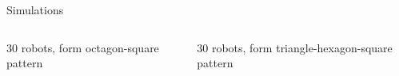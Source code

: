 \documentclass[10pt]{beamer}
\begin{document}
\begin{frame}{Simulations}
  \begin{columns}
    \begin{column}{.45\textwidth}
      30 robots, form octagon-square pattern
       \begin{center}
       \end{center}
    \end{column}
    \begin{column}{.45\textwidth}
      30 robots, form triangle-hexagon-square pattern
       \begin{center}
       \end{center}
     \end{column}
  \end{columns}
\end{frame}
\end{document}
